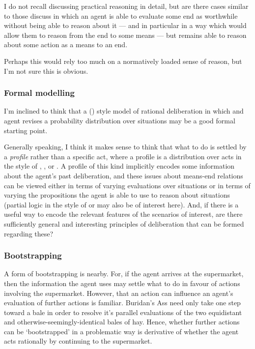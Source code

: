 \documentclass[10pt]{article}
\newcommand{\hozline}[0]{%
  \noindent\hdashrule[0.5ex][c]{\textwidth}{.1pt}{}
}
\begin{document}
I do not recall \citeauthor{Fricker:2007aa} discussing practical reasoning in detail, but are there cases similar to those \citeauthor{Fricker:2007aa} discuss in which an agent is able to evaluate some end as worthwhile without being able to reason about it --- and in particular in a way which would allow them to reason from the end to some means --- but remains able to reason about some action as a means to an end.

Perhaps this would rely too much on a normatively loaded sense of reason, but I'm not sure this is obvious.

\newpage

\hozline

\subsubsection*{Formal modelling}
\label{sec:formal-modelling}

I'm inclined to think that a \citeauthor{Skyrms:1990aa} (\citeyear{Skyrms:1990aa}) style model of rational deliberation in which and agent revises a probability distribution over situations may be a good formal starting point.

Generally speaking, I think it makes sense to think that what to do is settled by a \emph{profile} rather than a specific act, where a profile is a distribution over acts in the style of \citeauthor{Skyrms:1990aa}, \cite{Joyce:2012aa}, or \cite{Arntzenius:2008aa}.
A profile of this kind implicitly encodes some information about the agent's past deliberation, and these issues about means-end relations can be viewed either in terms of varying evaluations over situations or in terms of varying the propositions the agent is able to use to reason about situations (partial logic in the style of \cite{Blamey:1980aa,Blamey:2002aa} or \cite{Jaspars:1996aa} may also be of interest here).
And, if there is a useful way to encode the relevant features of the scenarios of interest, are there sufficiently general and interesting principles of deliberation that can be formed regarding these?

\hozline

\subsubsection*{Bootstrapping}
\label{sec:bootstrapping}

A form of bootstrapping is nearby.
For, if the agent arrives at the supermarket, then the information the agent uses may settle what to do in favour of actions involving the supermarket.
However, that an action can influence an agent's evaluation of further actions is familiar.
Buridan's Ass need only take one step toward a bale in order to resolve it's parallel evaluations of the two equidistant and otherwise-seemingly-identical bales of hay.
Hence, whether further actions can be `bootstrapped' in a problematic way is derivative of whether the agent acts rationally by continuing to the supermarket.
\end{document}
